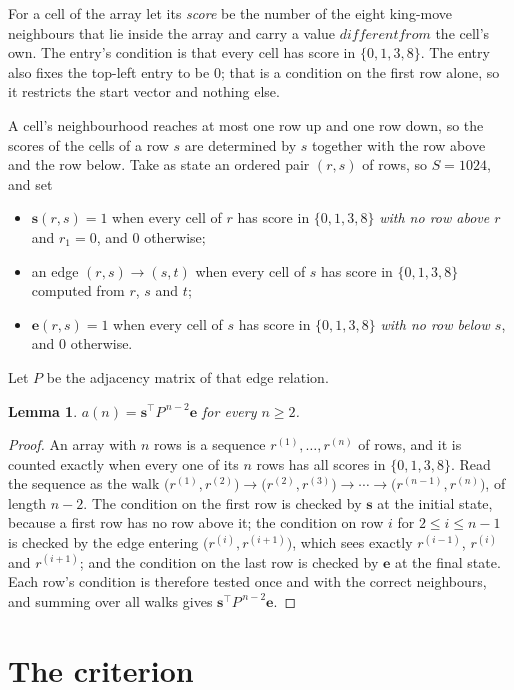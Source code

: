 \documentclass[11pt,a4paper]{article}
\theoremstyle{plain}
\newtheorem{lemma}[theorem]{Lemma}
\theoremstyle{definition}
\begin{document}
For a cell of the array let its \emph{score} be the number of the eight king-move neighbours that lie inside
the array and carry a value $different from$ the cell's own. The entry's condition is that every cell
has score in $\{0,1,3,8\}$. The entry also fixes the top-left entry to be $0$; that is a condition on the first row alone, so it restricts the start vector and nothing else.

A cell's neighbourhood reaches at most one row up and one row down, so the scores of the
cells of a row $s$ are determined by $s$ together with the row above and the row below.
Take as state an ordered pair $(r,s)$ of rows, so $S=1024$, and set
\begin{itemize}
\item $\mathbf{s}(r,s)=1$ when every cell of $r$ has score in $\{0,1,3,8\}$ \emph{with no row
above $r$} and $r_1=0$, and $0$ otherwise;
\item an edge $(r,s)\to(s,t)$ when every cell of $s$ has score in $\{0,1,3,8\}$ computed from
$r$, $s$ and $t$;
\item $\mathbf{e}(r,s)=1$ when every cell of $s$ has score in $\{0,1,3,8\}$ \emph{with no row
below $s$}, and $0$ otherwise.
\end{itemize}
Let $P$ be the adjacency matrix of that edge relation.

\begin{lemma}\label{lem:walk}
$a(n)=\mathbf{s}^{\!\top}P^{\,n-2}\mathbf{e}$ for every $n\ge2$.
\end{lemma}

\begin{proof}
An array with $n$ rows is a sequence $r^{(1)},\dots,r^{(n)}$ of rows, and it is counted
exactly when every one of its $n$ rows has all scores in $\{0,1,3,8\}$. Read the sequence as the
walk $\bigl(r^{(1)},r^{(2)}\bigr)\to\bigl(r^{(2)},r^{(3)}\bigr)\to\cdots\to
\bigl(r^{(n-1)},r^{(n)}\bigr)$, of length $n-2$. The condition on the first row is
checked by $\mathbf{s}$ at the initial state, because a first row has no row above it; the
condition on row $i$ for $2\le i\le n-1$ is checked by the edge entering
$\bigl(r^{(i)},r^{(i+1)}\bigr)$, which sees exactly $r^{(i-1)}$, $r^{(i)}$ and
$r^{(i+1)}$; and the condition on the last row is checked by $\mathbf{e}$ at the final
state. Each row's condition is therefore tested once and with the correct neighbours, and
summing over all walks gives $\mathbf{s}^{\!\top}P^{\,n-2}\mathbf{e}$.
\end{proof}

\section{The criterion}
\end{document}
